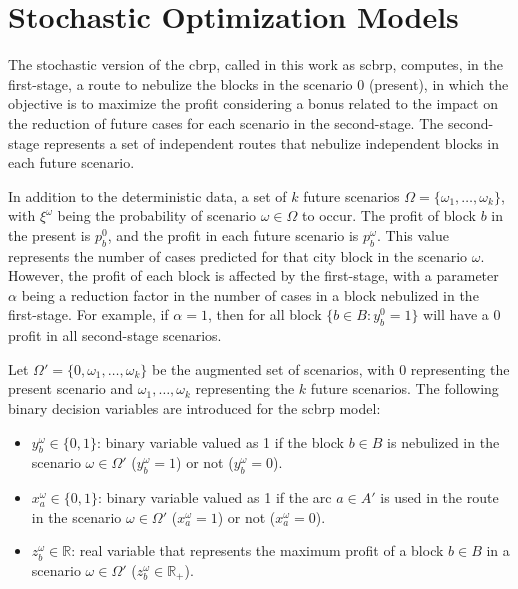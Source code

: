 \section{Stochastic Optimization Models}\label{sec:cbrp-stochastic-models}

The stochastic version of the \gls{cbrp}, called in this work as \gls{scbrp},
computes, in the first-stage, a route to nebulize the blocks in the scenario $0$
(present), in which the objective is to maximize the profit considering a bonus
related to the impact on the reduction of future cases for each scenario in the
second-stage. The second-stage represents a set of independent routes that
nebulize independent blocks in each future scenario.

In addition to the deterministic data, a set of $k$ future scenarios $\Omega =
	\{\omega_1, \dots, \omega_k\}$, with $\xi^{\omega}$ being the probability of
scenario $\omega \in \Omega$ to occur. The profit of block $b$ in the
present is $p_{b}^{0}$, and the profit in each future scenario is
$p_{b}^{\omega}$. This value represents the number of cases predicted for
that city block in the scenario $\omega$. However, the profit of each block
is affected by the first-stage, with a parameter $\alpha$ being a reduction
factor in the number of cases in a block nebulized in the first-stage. For
example, if $\alpha = 1$, then for all block $\{b \in B: y_{b}^{0} = 1\}$
will have a $0$ profit in all second-stage scenarios.

Let $\Omega' = \{0, \omega_1, \dots, \omega_k\}$ be the augmented set of
scenarios, with $0$ representing the present scenario and $\omega_1, \dots,
	\omega_k$ representing the $k$ future scenarios. The following binary decision
variables are introduced for the \gls{scbrp} model:

\begin{itemize}
	\item $y_{b}^{\omega} \in \{0, 1\}$: binary variable valued as 1 if the block $b \in B$ is nebulized in the scenario $\omega \in \Omega'$ ($y_{b}^{\omega} = 1$) or not ($y_{b}^{\omega} = 0$).
	\item $x_{a}^{\omega} \in \{0, 1\}$: binary variable valued as 1 if the arc $a \in A'$ is used in the route in the scenario $\omega \in \Omega'$ ($x_{a}^{\omega} = 1$) or not ($x_{a}^{\omega} = 0$).
	\item $z_{b}^{\omega} \in \mathbb{R}$: real variable that represents the maximum profit of a block $b \in B$ in a scenario $\omega \in \Omega'$ ($z_{b}^{\omega} \in \mathbb{R}_{+}$).
\end{itemize}

